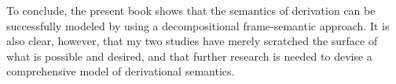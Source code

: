 To conclude, the present book shows that the semantics of derivation can be successfully modeled by using a decompositional frame-semantic approach. It is also clear, however, that my two studies have merely scratched the surface of what is possible and desired, and that further research is needed to devise a comprehensive model of derivational semantics. 

